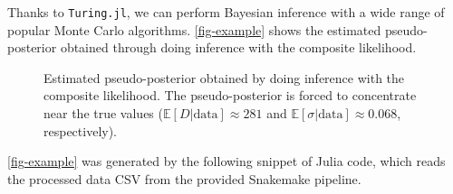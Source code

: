 \documentclass[
]{article}
\begin{document}
Thanks to \texttt{Turing.jl}, we can perform Bayesian inference with a
wide range of popular Monte Carlo algorithms. \autoref{fig-example}
shows the estimated pseudo-posterior obtained through doing inference
with the composite likelihood.

\begin{figure}[h]


\caption{\label{fig-example}Estimated pseudo-posterior obtained by doing
inference with the composite likelihood. The pseudo-posterior is forced
to concentrate near the true values
(\(\mathbb E[D | \text{data}]\approx 281\) and
\(\mathbb E[\sigma | \text{data}]\approx 0.068\), respectively).}

\end{figure}%

\autoref{fig-example} was generated by the following snippet of Julia
code, which reads the processed data CSV from the provided Snakemake
pipeline.
\end{document}
